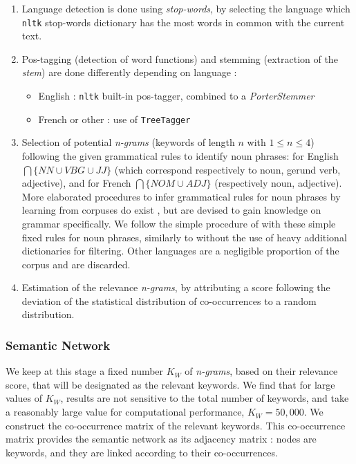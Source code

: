 \begin{enumerate}
\item Language detection is done using \textit{stop-words}, by selecting the language which \texttt{nltk} stop-words dictionary has the most words in common with the current text.
\item Pos-tagging (detection of word functions) and stemming (extraction of the \emph{stem}) are done differently depending on language :
\begin{itemize}
\item English : \texttt{nltk} built-in pos-tagger, combined to a \emph{PorterStemmer}
\item French or other : use of \texttt{TreeTagger}~\citep{schmid1994probabilistic}
\end{itemize}
\item Selection of potential \textit{n-grams} (keywords of length $n$ with $1 \leq n \leq 4$) following the given grammatical rules to identify noun phrases: for English $\bigcap \{NN \cup VBG \cup JJ \}$ (which correspond respectively to noun, gerund verb, adjective), and for French $\bigcap \{NOM \cup ADJ\}$ (respectively noun, adjective). More elaborated procedures to infer grammatical rules for noun phrases by learning from corpuses do exist \citep{cardie1998error}, but are devised to gain knowledge on grammar specifically. We follow the simple procedure of \cite{chavalarias2013phylomemetic} with these simple fixed rules for noun phrases, similarly to \cite{kumar2008automatic} without the use of heavy additional dictionaries for filtering. Other languages are a negligible proportion of the corpus and are discarded.
\item Estimation of the relevance \textit{n-grams}, by attributing a score following the deviation of the statistical distribution of co-occurrences to a random distribution.
\end{enumerate}



\subsubsection*{Semantic Network}

We keep at this stage a fixed number $K_W$ of \textit{n-grams}, based on their relevance score, that will be designated as the relevant keywords. We find that for large values of $K_W$, results are not sensitive to the total number of keywords, and take a reasonably large value for computational performance, $K_W = 50,000$. We construct the co-occurrence matrix of the relevant keywords. This co-occurrence matrix provides the semantic network as its adjacency matrix : nodes are keywords, and they are linked according to their co-occurrences.



